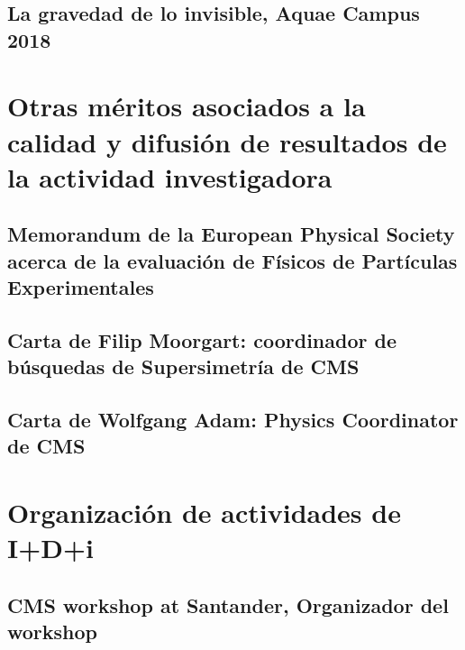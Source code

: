 \documentclass[a4paper, 11pt, twoside, openright]{report}
\begin{document}
\subsection{La gravedad de lo invisible, Aquae Campus 2018} 




\section{Otras méritos asociados a la calidad y difusión de resultados de la actividad investigadora}
\subsection{Memorandum de la European Physical Society acerca de la evaluación de Físicos de Partículas Experimentales}

\subsection{Carta de Filip Moorgart: coordinador de búsquedas de Supersimetría de CMS}

\subsection{Carta de Wolfgang Adam: Physics Coordinator de CMS}




\section{Organización de actividades de I+D+i}

\subsection{CMS workshop at Santander, Organizador del workshop}

\end{document}
